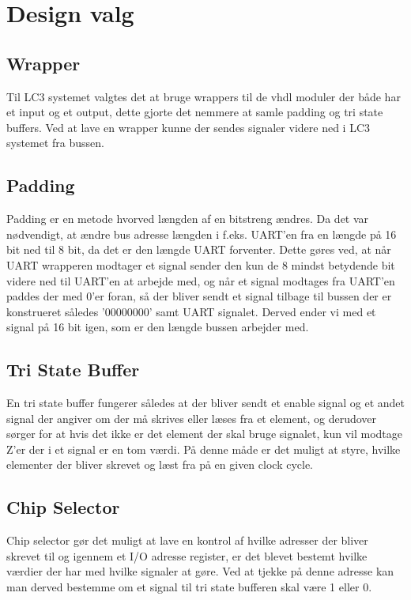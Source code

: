 \section{Design valg}

\subsection{Wrapper}
Til LC3 systemet valgtes det at bruge wrappers til de vhdl moduler der både har et input og et output, dette gjorte det nemmere at samle padding og tri state buffers. Ved at lave en wrapper kunne der sendes signaler videre ned i LC3 systemet fra bussen.

\subsection{Padding}
Padding er en metode hvorved længden af en bitstreng ændres. Da det var nødvendigt, at ændre bus adresse længden i f.eks. UART'en fra en længde på 16 bit ned til 8 bit, da det er den længde UART forventer. Dette gøres ved, at når UART wrapperen modtager et signal sender den kun de 8 mindst betydende bit videre ned til UART'en at arbejde med, og når et signal modtages fra UART'en paddes der med 0'er foran, så der bliver sendt et signal tilbage til bussen der er konstrueret således '00000000' samt UART signalet. Derved ender vi med et signal på 16 bit igen, som er den længde bussen arbejder med. 


\subsection{Tri State Buffer}
En tri state buffer fungerer således at der bliver sendt et enable signal og et andet signal der angiver om der må skrives eller læses fra et element, og derudover sørger for at hvis det ikke er det element der skal bruge signalet, kun vil modtage Z'er der i et signal er en tom værdi. På denne måde er det muligt at styre, hvilke elementer der bliver skrevet og læst fra på en given clock cycle. 


\subsection{Chip Selector}
Chip selector gør det muligt at lave en kontrol af hvilke adresser der bliver skrevet til og igennem et I/O adresse register, er det blevet bestemt hvilke værdier der har med hvilke signaler at gøre. Ved at tjekke på denne adresse kan man derved bestemme om et signal til tri state bufferen skal være 1 eller 0.
